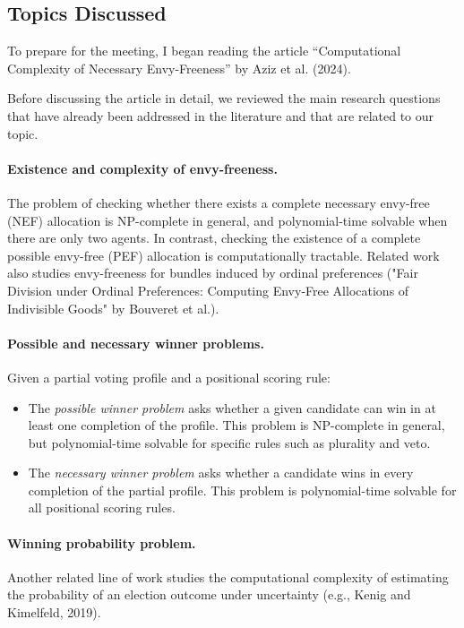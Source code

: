 \documentclass{article}
\begin{document}
\subsection{Topics Discussed}

To prepare for the meeting, I began reading the article 
``Computational Complexity of Necessary Envy-Freeness'' by Aziz et al. (2024).

Before discussing the article in detail, we reviewed the main research questions that have already been addressed in the literature and that are related to our topic.
\paragraph{Existence and complexity of envy-freeness.}
The problem of checking whether there exists a complete necessary envy-free (NEF) allocation is NP-complete in general, and polynomial-time solvable when there are only two agents. 
In contrast, checking the existence of a complete possible envy-free (PEF) allocation is computationally tractable.
Related work also studies envy-freeness for bundles induced by ordinal preferences ("Fair Division under Ordinal Preferences: Computing Envy-Free Allocations of Indivisible Goods" by Bouveret et al.).

\paragraph{Possible and necessary winner problems.}
Given a partial voting profile and a positional scoring rule:
\begin{itemize}
    \item The \textit{possible winner problem} asks whether a given candidate can win in at least one completion of the profile. This problem is NP-complete in general, but polynomial-time solvable for specific rules such as plurality and veto.
    \item The \textit{necessary winner problem} asks whether a candidate wins in every completion of the partial profile. This problem is polynomial-time solvable for all positional scoring rules.
\end{itemize}

\paragraph{Winning probability problem.}
Another related line of work studies the computational complexity of estimating the probability of an election outcome under uncertainty (e.g., Kenig and Kimelfeld, 2019).
\end{document}
